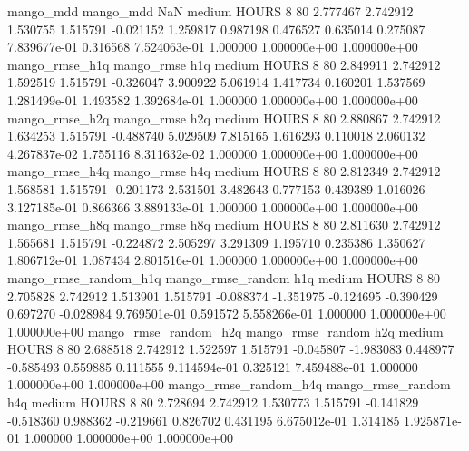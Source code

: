             mango_mdd         mango_mdd                  NaN     medium    HOURS                 8 80  2.777467       2.742912 1.530755       1.515791   -0.021152      1.259817      0.987198     0.476527       0.635014  0.275087 7.839677e-01     0.316568   7.524063e-01            1.000000    1.000000e+00        1.000000e+00
       mango_rmse_h1q        mango_rmse                  h1q     medium    HOURS                 8 80  2.849911       2.742912 1.592519       1.515791   -0.326047      3.900922      5.061914     1.417734       0.160201  1.537569 1.281499e-01     1.493582   1.392684e-01            1.000000    1.000000e+00        1.000000e+00
       mango_rmse_h2q        mango_rmse                  h2q     medium    HOURS                 8 80  2.880867       2.742912 1.634253       1.515791   -0.488740      5.029509      7.815165     1.616293       0.110018  2.060132 4.267837e-02     1.755116   8.311632e-02            1.000000    1.000000e+00        1.000000e+00
       mango_rmse_h4q        mango_rmse                  h4q     medium    HOURS                 8 80  2.812349       2.742912 1.568581       1.515791   -0.201173      2.531501      3.482643     0.777153       0.439389  1.016026 3.127185e-01     0.866366   3.889133e-01            1.000000    1.000000e+00        1.000000e+00
       mango_rmse_h8q        mango_rmse                  h8q     medium    HOURS                 8 80  2.811630       2.742912 1.565681       1.515791   -0.224872      2.505297      3.291309     1.195710       0.235386  1.350627 1.806712e-01     1.087434   2.801516e-01            1.000000    1.000000e+00        1.000000e+00
mango_rmse_random_h1q mango_rmse_random                  h1q     medium    HOURS                 8 80  2.705828       2.742912 1.513901       1.515791   -0.088374     -1.351975     -0.124695    -0.390429       0.697270 -0.028984 9.769501e-01     0.591572   5.558266e-01            1.000000    1.000000e+00        1.000000e+00
mango_rmse_random_h2q mango_rmse_random                  h2q     medium    HOURS                 8 80  2.688518       2.742912 1.522597       1.515791   -0.045807     -1.983083      0.448977    -0.585493       0.559885  0.111555 9.114594e-01     0.325121   7.459488e-01            1.000000    1.000000e+00        1.000000e+00
mango_rmse_random_h4q mango_rmse_random                  h4q     medium    HOURS                 8 80  2.728694       2.742912 1.530773       1.515791   -0.141829     -0.518360      0.988362    -0.219661       0.826702  0.431195 6.675012e-01     1.314185   1.925871e-01            1.000000    1.000000e+00        1.000000e+00
